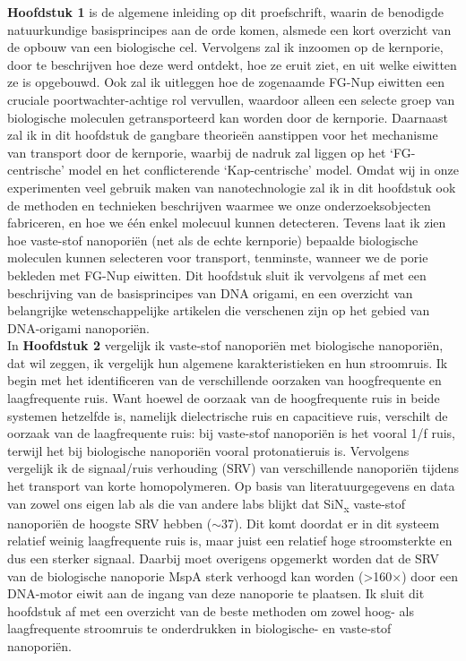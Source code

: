 {\noindent \textbf{Hoofdstuk 1} is de algemene inleiding op dit proefschrift, waarin de benodigde natuurkundige basisprincipes aan de orde komen, alsmede een kort overzicht van de opbouw van een biologische cel. Vervolgens zal ik inzoomen op de kernporie, door te beschrijven hoe deze werd ontdekt, hoe ze eruit ziet, en uit welke eiwitten ze is opgebouwd. Ook zal ik uitleggen hoe de zogenaamde FG-Nup eiwitten een cruciale poortwachter-achtige rol vervullen, waardoor alleen een selecte groep van biologische moleculen getransporteerd kan worden door de kernporie. Daarnaast zal ik in dit hoofdstuk de gangbare theorieën aanstippen voor het mechanisme van transport door de kernporie, waarbij de nadruk zal liggen op het `FG-centrische' model en het conflicterende `Kap-centrische' model.
Omdat wij in onze experimenten veel gebruik maken van nanotechnologie zal ik in dit hoofdstuk ook de methoden en technieken beschrijven waarmee we onze onderzoeksobjecten fabriceren, en hoe we één enkel molecuul kunnen detecteren. Tevens laat ik zien hoe vaste-stof nano\-poriën (net als de echte kernporie) bepaalde biologische moleculen kunnen selecteren voor transport, tenminste, wanneer we de porie bekleden met FG-Nup eiwitten. Dit hoofdstuk sluit ik vervolgens af met een beschrijving van de basisprincipes van DNA origami, en een overzicht van belangrijke wetenschappelijke artikelen die verschenen zijn op het gebied van DNA-origami nano\-poriën.\\[0.5pt]
	
	\noindent In \textbf{Hoofdstuk 2} vergelijk ik vaste-stof nano\-poriën met biologische nano\-poriën, dat wil zeggen, ik vergelijk hun algemene karakteristieken en hun stroomruis. Ik begin met het identificeren van de verschillende oorzaken van hoogfrequente en laagfrequente ruis. Want hoewel de oorzaak van de hoogfrequente ruis in beide systemen hetzelfde is, namelijk dielectrische ruis en capacitieve ruis, verschilt de oorzaak van de laagfrequente ruis: bij vaste-stof nano\-poriën is het vooral 1/f ruis, terwijl het bij biologische nano\-poriën vooral protonatieruis is. Vervolgens vergelijk ik de signaal/ruis verhouding (SRV) van verschillende nano\-poriën tijdens het transport van korte homopolymeren. Op basis van literatuurgegevens en data van zowel ons eigen lab als die van andere labs blijkt dat SiN\textsubscript{x} vaste-stof nano\-poriën de hoogste SRV hebben ($\sim$37). Dit komt doordat er in dit systeem relatief weinig laagfrequente ruis is, maar juist een relatief hoge stroomsterkte en dus een sterker signaal. Daarbij moet overigens opgemerkt worden dat de SRV van de biologische nanoporie MspA sterk verhoogd kan worden (>160$\times$) door een DNA-motor eiwit aan de ingang van deze nanoporie te plaatsen. Ik sluit dit hoofdstuk af met een overzicht van de beste methoden om zowel hoog- als laagfrequente stroomruis te onderdrukken in biologische- en vaste-stof nano\-poriën.\\[0.5pt]
	
}
